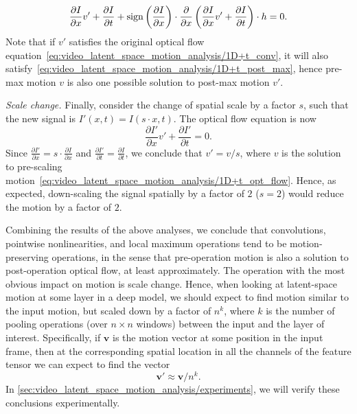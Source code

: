 \begin{equation}
\begin{split}
    \frac{\partial I}{\partial x}v'  + \frac{\partial I}{\partial t} + \operatorname{sign}\left(\frac{\partial I}{\partial x}\right) \cdot \frac{\partial}{\partial x} \left( \frac{\partial I}{\partial x}v'  + \frac{\partial I}{\partial t}\right)\cdot h = 0.
\end{split}
\label{eq:video_latent_space_motion_analysis/1D+t_post_max}
\end{equation}
Note that if $v'$ satisfies the original optical flow equation~\cref{eq:video_latent_space_motion_analysis/1D+t_conv}, it will also satisfy~\cref{eq:video_latent_space_motion_analysis/1D+t_post_max}, hence pre-max motion $v$ is also one possible solution to post-max motion $v'$.

\textit{Scale change.} Finally, consider the change of spatial scale by a factor $s$, such that the new signal is $I'(x,t) =I(s\cdot x,t)$. The optical flow equation is now
\begin{equation}
    \frac{\partial I'}{\partial x}v'  + \frac{\partial I'}{\partial t} = 0.
    \label{eq:video_latent_space_motion_analysis/1D+t_scale_change}
\end{equation}
Since $\frac{\partial I'}{\partial x}=s\cdot \frac{\partial I}{\partial x}$ and $\frac{\partial I'}{\partial t}=\frac{\partial I}{\partial t}$, we conclude that $v'=v/s$, where $v$ is the solution to pre-scaling motion~\cref{eq:video_latent_space_motion_analysis/1D+t_opt_flow}. Hence, as expected, down-scaling the signal spatially by a factor of $2$ ($s=2$) would reduce the motion by a factor of $2$.

Combining the results of the above analyses, we conclude that convolutions, pointwise nonlinearities, and local maximum operations tend to be motion-preserving operations, in the sense that pre-operation motion is also a solution to post-operation optical flow, at least approximately. The operation with the most obvious impact on motion is scale change. Hence, when looking at latent-space motion at some layer in a deep model, we should expect to find motion similar to the input motion, but scaled down by a factor of $n^k$, where $k$ is the number of pooling operations (over $n\times n$ windows) between the input and the layer of interest. Specifically, if $\mathbf{v}$ is the motion vector at some position in the input frame, then at the corresponding spatial location in all the channels of the feature tensor we can expect to find the vector
\begin{equation}
    \mathbf{v}'\approx \mathbf{v}/n^k.
    \label{eq:video_latent_space_motion_analysis/mv_scale}
\end{equation}
In \cref{sec:video_latent_space_motion_analysis/experiments}, we will verify these conclusions experimentally.


